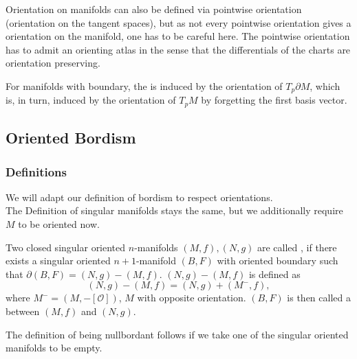 \documentclass[a4paper,11pt]{article}
\begin{document}
\begin{remark}
    Orientation on manifolds can also be defined via pointwise orientation (orientation on the tangent spaces), but as not every pointwise orientation gives a orientation on the manifold, one has to be careful here. The pointwise orientation has to admit an orienting atlas in the sense that the differentials of the charts are orientation preserving.
\end{remark}

For manifolds with boundary, the  is induced by the orientation of \(T_p\partial M\), which is, in turn, induced by the orientation of \(T_p M\) by forgetting the first basis vector.



\subsection{Oriented Bordism}\label{Kap Oriented Bordism}

\subsubsection{Definitions}

We will adapt our definition of bordism to respect orientations.\\
The Definition of singular manifolds stays the same, but we additionally require \(M\) to be oriented now.

\begin{definition}
    Two closed singular oriented \(n\)-manifolds \((M,f),(N,g)\) are called , if there exists a singular oriented \(n+1\)-manifold \((B,F)\) with oriented boundary such that \(\partial (B,F) = (N,g)-(M,f)\). \((N,g)-(M,f)\) is defined as
    \[(N,g)-(M,f)=(N,g)+(M^-,f),\]
    where \(M^-=(M,-[\mathcal{O}])\), \(M\) with opposite orientation. \((B,F)\) is then called a  between \((M,f)\) and \((N,g)\).
\end{definition}

\begin{remark}
    The definition of being nullbordant follows if we take one of the singular oriented manifolds to be empty.
\end{remark}
\end{document}
